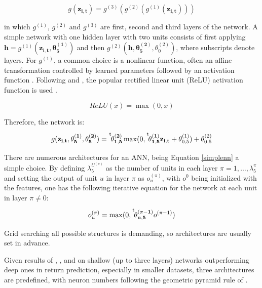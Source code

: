 \documentclass[preprint,12pt,authoryear]{elsarticle}
\newcommand*{\transp}[2][-3mu]{\ensuremath{\mskip1mu\prescript{\smash{\mathrm t\mkern#1}}{}{\mathstrut#2}}}%
\begin{document}
\begin{equation}
g(\mathbf{z_{i,t}}) = g^{(3)}(g^{(2)}(g^{(1)}(\mathbf{z_{i,t}})))
\end{equation}

in which $g^{(1)}$, $g^{(2)}$ and $g^{(3)}$ are first, second and third layers of the network. A simple network with one hidden layer with two units consists of first applying $\mathbf{h} = g^{(1)}(\mathbf{z_{i,t}}, \mathbf{\theta^{(1)}_{5}})$ and then $g^{(2)}(\mathbf{h}, \mathbf{\theta^{(2)}_{5}}, \theta_{0}^{(2)})$, where subscripts denote layers. For $g^{(1)}$, a common choice is a nonlinear function, often an affine transformation controlled by learned parameters followed by an activation function \citep{Goodfellow-et-al-2016}. Following \citet{gukellyxiu2020} and \citet{hanauerkalsbach2023}, the popular rectified linear unit (ReLU) activation function is used \citep{fenglu2019}.


\begin{equation}
ReLU(x) = \max(0,x)
\end{equation}

Therefore, the network is:

\begin{equation}
\label{simplenn}
g(\mathbf{z_{i,t}}, \mathbf{\theta^{(1)}_{5}}, \mathbf{\theta^{(2)}_{5}}) = \transp{\mathbf{\theta^{(2)}_{1,5}}}\max(0, \transp{\mathbf{\theta^{(1)}_{1,5}}}{\mathbf{z_{i,t}}} + \theta_{0,5}^{(1)}) +  \theta_{0,5}^{(2)}
\end{equation}

There are numerous architectures for an ANN, being Equation \ref{simplenn} a simple choice. By defining $\lambda^{U^{(\pi)}}_{5}$ as the number of units in each layer $\pi = 1, \ldots, \lambda^{\pi}_{5}$ and setting the output of unit $u$ in layer $\pi$ as $o^{(\pi)}_{u}$, with $o^{0}$ being initialized with the features, one has the following iterative equation for the network at each unit in layer $\pi \neq 0$:

\begin{equation}
    o^{(\pi)}_{u} = \max(0, \transp{\mathbf{\theta_{u,5}^{(\pi-1)}}}o^{(\pi-1)})
\end{equation}

Grid searching all possible structures is demanding, so architectures are usually set in advance.

Given results of \citet{eldanshamir2016}, \citet{gukellyxiu2020}, and \citet{orimoloyeetal2019} on shallow (up to three layers) networks outperforming deep ones in return prediction, especially in smaller datasets, three architectures are predefined, with neuron numbers following the geometric pyramid rule of \citet{masters1993}.
\end{document}

